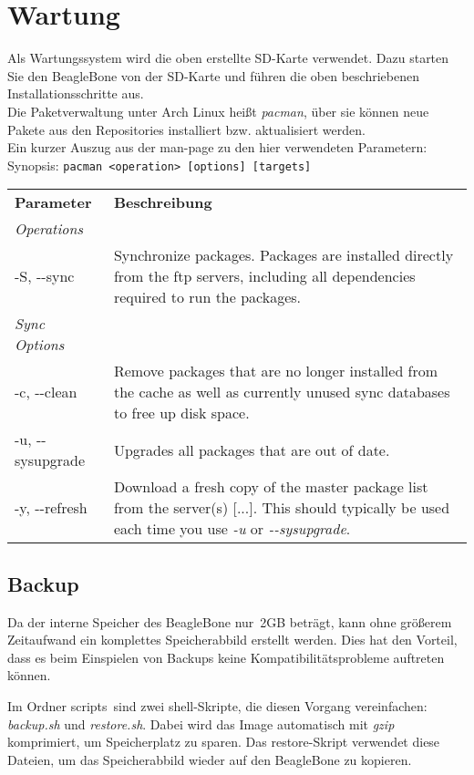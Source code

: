 \documentclass[manual.tex]{subfiles}
\begin{document}
\section{Wartung}
Als Wartungssystem wird die oben erstellte SD-Karte verwendet. Dazu starten Sie den BeagleBone von der SD-Karte und führen die oben beschriebenen Installationsschritte aus.\\

Die Paketverwaltung unter Arch Linux heißt \emph{pacman}, über sie können neue Pakete aus den Repositories installiert bzw. aktualisiert werden.\\
Ein kurzer Auszug aus der man-page zu den hier verwendeten Parametern:\\

Synopsis: \texttt{pacman <operation> [options] [targets]}\\

\begin{longtabu} to \textwidth {X[1] X[4]}

\textbf{Parameter} & \textbf{Beschreibung}\\
\textit{Operations}\\
-S, -\--sync & Synchronize packages. Packages are installed directly from the ftp servers, including all dependencies required to run the packages.\\

\textit{Sync Options}\\
-c, -\--clean & Remove packages that are no longer installed from the cache as well as currently unused sync databases to free up disk space.\\
-u, -\--sysupgrade & Upgrades all packages that are out of date.\\
-y, -\--refresh & Download a fresh copy of the master package list from the server(s) [...]. This should typically be used each time you use \textit{-u} or \textit{-\--sysupgrade}.\\
\end{longtabu}


\subsection{Backup}
Da der interne Speicher des BeagleBone \glqq nur\grqq ~2GB beträgt, kann ohne größerem Zeitaufwand ein komplettes Speicherabbild erstellt werden. Dies hat den Vorteil, dass es beim Einspielen von Backups keine Kompatibilitätsprobleme auftreten können.

Im Ordner \glqq scripts\grqq ~sind zwei shell-Skripte, die diesen Vorgang vereinfachen: \textit{backup.sh} und \textit{restore.sh}. Dabei wird das Image automatisch mit \emph{gzip} komprimiert, um Speicherplatz zu sparen. Das restore-Skript verwendet diese Dateien, um das Speicherabbild wieder auf den BeagleBone zu kopieren.\\
\end{document}

